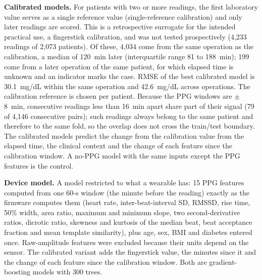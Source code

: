 \documentclass[11pt]{article}
\newcommand{\mgdl}{mg/dL}
\begin{document}
\textbf{Calibrated models.} For patients with two or more readings, the first laboratory value serves as a single reference value (single-reference calibration) and only later readings are scored. This is a retrospective surrogate for the intended practical use, a fingerstick calibration, and was not tested prospectively (4,233 readings of 2,073 patients). Of these, 4,034 come from the same operation as the calibration, a median of 120~min later (interquartile range 81 to 188~min); 199 come from a later operation of the same patient, for which elapsed time is unknown and an indicator marks the case. RMSE of the best calibrated model is 30.1~\mgdl{} within the same operation and 42.6~\mgdl{} across operations. The calibration reference is chosen per patient. Because the PPG windows are $\pm$8~min, consecutive readings less than 16~min apart share part of their signal (79 of 4,146 consecutive pairs); such readings always belong to the same patient and therefore to the same fold, so the overlap does not cross the train/test boundary. The calibrated models predict the change from the calibration value from the elapsed time, the clinical context and the change of each feature since the calibration window. A no-PPG model with the same inputs except the PPG features is the control.

\textbf{Device model.} A model restricted to what a wearable has: 15 PPG features computed from one 60-s window (the minute before the reading) exactly as the firmware computes them (heart rate, inter-beat-interval SD, RMSSD, rise time, 50\% width, area ratio, maximum and minimum slope, two second-derivative ratios, dicrotic ratio, skewness and kurtosis of the median beat, beat acceptance fraction and mean template similarity), plus age, sex, BMI and diabetes entered once. Raw-amplitude features were excluded because their units depend on the sensor. The calibrated variant adds the fingerstick value, the minutes since it and the change of each feature since the calibration window. Both are gradient-boosting models with 300 trees.
\end{document}
